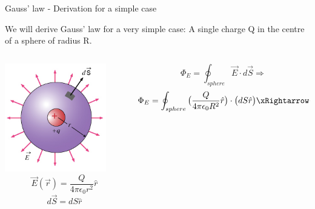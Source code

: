 \begin{frame}{Gauss' law - Derivation for a simple case}

We will derive Gauss' law for a very simple case: A single charge Q in the centre of a sphere of radius R.

\begin{columns}
  \begin{column}{0.34\textwidth}
   \begin{center}
    \includegraphics[width=0.85\textwidth]{./images/schematics/gauss_law_S.png}
    \begin{equation*}
        \vec{E}(\vec{r}) = \frac{Q}{4\pi\epsilon_0 r^{2}} \hat{r}
    \end{equation*}
    \begin{equation*}
        d\vec{S} = dS \hat{r}
    \end{equation*}
   \end{center}
  \end{column}
  \begin{column}{0.66\textwidth}
    \begin{equation*}
        \Phi_E = \oint_{sphere} \vec{E} \cdot d\vec{S} \Rightarrow
    \end{equation*}
    \begin{equation*}
        \Phi_E = \oint_{sphere} \big( \frac{Q}{4\pi\epsilon_0 R^{2}} \hat{r} \big) \cdot \big( dS \hat{r} \big) \xRightarrow {\hat{r}\cdot\hat{r}=1}

\end{equation*}
\end{column}
\end{columns}
\end{frame}
